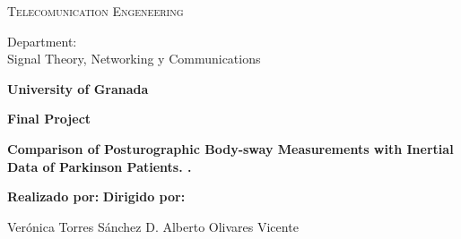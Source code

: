 \begin{titlepage}
\label{ch:portada}
\begin{center}

{\Large\textsc{Telecomunication Engeneering}}


Department:  \\ Signal Theory, Networking y Communications

\textbf{University of Granada}


\vspace{0.5cm}

\begin{figure}[h]
	\centering
	\label{fig:ugr}
\end{figure}


\vspace{0.5cm}
\textbf{Final Project}


\vspace{0.9cm}


{\Huge\textbf{Comparison of Posturographic Body-sway Measurements with Inertial Data of Parkinson Patients. .}}


\end{center}


\vspace{1.5cm}
\textbf{Realizado por:}  \hfill \textbf{Dirigido por:}

Ver\'onica Torres S\'anchez \hfill D. Alberto Olivares Vicente



\end{titlepage}
